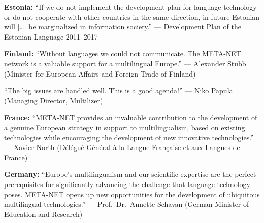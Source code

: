 \documentclass[10pt, plain]{../../metanetpaper}
\begin{document}
\medskip \textbf{Estonia:} ``If we do not implement the development plan for language technology or do not cooperate with other countries in the same direction, in future Estonian will [\dots] be marginalized in information society.'' --- Development Plan of the Estonian Language 2011--2017

\medskip \textbf{Finland:} ``Without languages we could not communicate. The META-NET network is a valuable support for a multilingual Europe.'' --- Alexander Stubb (Minister for European Affairs and Foreign Trade of Finland)

\medskip ``The big issues are handled well. This is a good agenda!'' --- Niko Papula (Managing Director, Multilizer)

\medskip \textbf{France:} ``META-NET provides an invaluable contribution to the development of a genuine European strategy in support to multilingualism, based on existing technologies while encouraging the development of new innovative technologies.'' --- Xavier North (Délégué Général à la Langue Française et aux Langues de France)



\medskip \textbf{Germany:} ``Europe's multilingualism and our scientific expertise are the perfect prerequisites for significantly advancing the challenge that language technology poses. META-NET opens up new opportunities for the development of ubiquitous multilingual technologies.'' --- Prof.~Dr.~Annette Schavan (German Minister of Education and Research)




\end{document}
